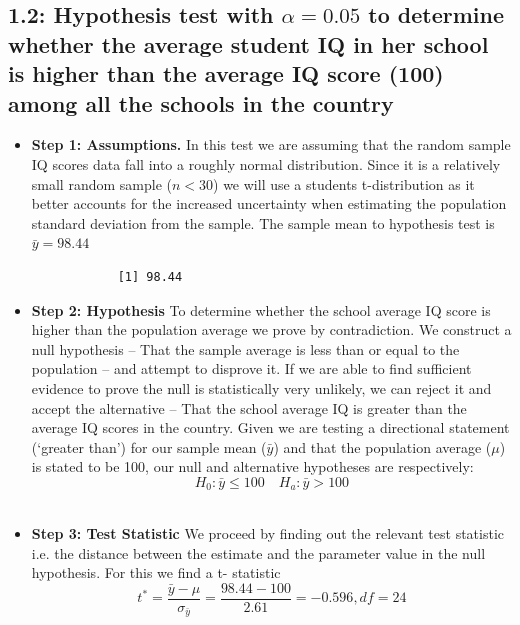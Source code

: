 \documentclass[12pt,letterpaper]{article}
\begin{document}
\noindent	
\vspace*{1cm}
	
\subsection*{1.2: Hypothesis test with $\alpha=0.05$ to determine whether the average student IQ in her school is higher than the average IQ score (100) among all the schools in the country}	
\begin{itemize}
	\item \textbf{Step 1: Assumptions. } In this test we are assuming that the random sample IQ scores data fall into a roughly normal distribution. Since it is a relatively small  random sample ($n < 30$) we will use a students t-distribution as it better accounts for the increased uncertainty when estimating the population standard deviation from the sample. The sample mean to hypothesis test is $\bar{y}=98.44$
		\ 
		\begin{verbatim}
			[1] 98.44
		\end{verbatim}
	\item \textbf{Step 2: Hypothesis}  To determine whether the school average IQ score is higher than the population average we prove by contradiction. We construct a null hypothesis – That the sample average is less than or equal to the population – and attempt to disprove it. If we are able to find sufficient evidence to prove the null is statistically very unlikely, we can reject it and accept the alternative – That the school average IQ is greater than the average IQ scores in the country. Given we are testing a directional statement (‘greater than’) for our sample mean ($\bar{y}$) and that the population average ($\mu$) is stated to be 100, our null and alternative hypotheses are respectively:
		\begin{equation}
			H_0:\bar{y} \le 100 \quad H_a: \bar{y} > 100
		\end{equation} \
	\item \textbf{Step 3: Test Statistic } 
	We proceed by finding out the relevant test statistic i.e. the distance between the estimate and the parameter value in the null hypothesis. For this we find a t- statistic 
		\begin{equation}
		t^* = \frac{\bar{y}-\mu}{\sigma_{\bar{y}}}= \frac{98.44-100}{2.61} = -0.596, df = 24
		\end{equation} \
		\ 

\end{itemize}
\end{document}
